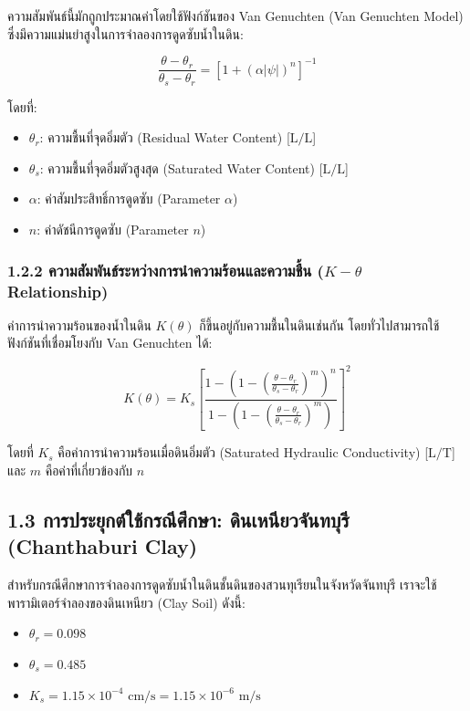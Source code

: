 \documentclass[11pt,a4paper,openany]{report}
\begin{document}
ความสัมพันธ์นี้มักถูกประมาณค่าโดยใช้ฟังก์ชันของ Van Genuchten (Van Genuchten Model) ซึ่งมีความแม่นยำสูงในการจำลองการดูดซับน้ำในดิน:

$$\frac{\theta - \theta_r}{\theta_s - \theta_r} = \left[ 1 + (\alpha |\psi|)^n \right]^{-1}$$


โดยที่:
\begin{itemize}
  \item $\theta_r$: ความชื้นที่จุดอิ่มตัว (Residual Water Content) [$\text{L}/\text{L}$]
  \item $\theta_s$: ความชื้นที่จุดอิ่มตัวสูงสุด (Saturated Water Content) [$\text{L}/\text{L}$]
  \item $\alpha$: ค่าสัมประสิทธิ์การดูดซับ (Parameter $\alpha$)
  \item $n$: ค่าดัชนีการดูดซับ (Parameter $n$)
\end{itemize}


\subsubsection{1.2.2 ความสัมพันธ์ระหว่างการนำความร้อนและความชื้น ($K - \theta$ Relationship)}

ค่าการนำความร้อนของน้ำในดิน $K(\theta)$ ก็ขึ้นอยู่กับความชื้นในดินเช่นกัน โดยทั่วไปสามารถใช้ฟังก์ชันที่เชื่อมโยงกับ Van Genuchten ได้:

$$K(\theta) = K_s \left[ \frac{1 - (1 - (\frac{\theta - \theta_r}{\theta_s - \theta_r})^m)^n}{1 - (1 - (\frac{\theta - \theta_r}{\theta_s - \theta_r})^m)} \right]^2$$


โดยที่ $K_s$ คือค่าการนำความร้อนเมื่อดินอิ่มตัว (Saturated Hydraulic Conductivity) [$\text{L}/\text{T}$] และ $m$ คือค่าที่เกี่ยวข้องกับ $n$

\subsection{1.3 การประยุกต์ใช้กรณีศึกษา: ดินเหนียวจันทบุรี (Chanthaburi Clay)}


สำหรับกรณีศึกษาการจำลองการดูดซับน้ำในดินชั้นดินของสวนทุเรียนในจังหวัดจันทบุรี เราจะใช้พารามิเตอร์จำลองของดินเหนียว (Clay Soil) ดังนี้:

\begin{itemize}
  \item $\theta_r = 0.098$
  \item $\theta_s = 0.485$
  \item $K_s = 1.15 \times 10^{-4} \text{ cm}/\text{s} = 1.15 \times 10^{-6} \text{ m}/\text{s}$
\end{itemize}
\end{document}
